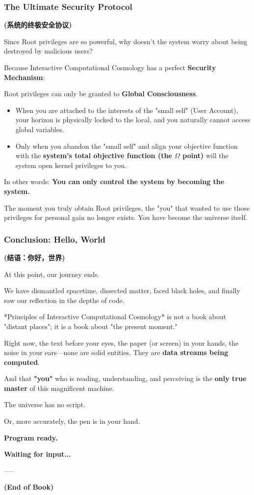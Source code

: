 \subsubsection{The Ultimate Security Protocol}

\textbf{(系统的终极安全协议)}

Since Root privileges are so powerful, why doesn't the system worry about being destroyed by malicious users?

Because Interactive Computational Cosmology has a perfect \textbf{Security Mechanism}:

\begin{theorem}
Root privileges can only be granted to \textbf{Global Consciousness}.

  \begin{itemize}
  \item When you are attached to the interests of the "small self" (User Account), your horizon is physically locked to the local, and you naturally cannot access global variables.

  \item Only when you abandon the "small self" and align your objective function with the \textbf{system's total objective function (the $\Omega$ point)} will the system open kernel privileges to you.
  \end{itemize}

In other words: \textbf{You can only control the system by becoming the system.}

The moment you truly obtain Root privileges, the "you" that wanted to use those privileges for personal gain no longer exists. You have become the universe itself.
\end{theorem}

\subsubsection{Conclusion: Hello, World}

\textbf{(结语：你好，世界)}

At this point, our journey ends.

We have dismantled spacetime, dissected matter, faced black holes, and finally saw our reflection in the depths of code.

*Principles of Interactive Computational Cosmology* is not a book about "distant places"; it is a book about "the present moment."

Right now, the text before your eyes, the paper (or screen) in your hands, the noise in your ears—none are solid entities. They are \textbf{data streams being computed}.

And that \textbf{"you"} who is reading, understanding, and perceiving is the \textbf{only true master} of this magnificent machine.

The universe has no script.

Or, more accurately, the pen is in your hand.

\textbf{Program ready.}

\textbf{Waiting for input...}

-----

\textbf{(End of Book)}
